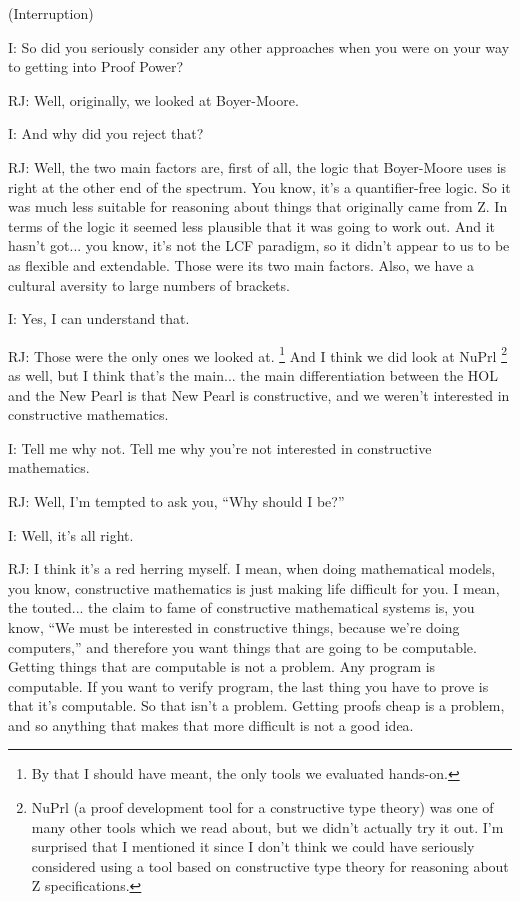 \documentclass[10pt,titlepage]{book}
\begin{document}
(Interruption)

I: So did you seriously consider any other approaches when you were on your way to getting into Proof Power?

RJ: Well, originally, we looked at Boyer-Moore.

I: And why did you reject that?

RJ: Well, the two main factors are, first of all, the logic that Boyer-Moore uses is right at the other end of the spectrum. You know, it's a quantifier-free logic.
So it was much less suitable for reasoning about things that originally came from Z.
In terms of the logic it seemed less plausible that it was going to work out.
And it hasn't got... you know, it's not the LCF paradigm, so it didn't appear to us to be as flexible and extendable.
Those were its two main factors.
Also, we have a cultural aversity to large numbers of brackets.

I: Yes, I can understand that.

RJ: Those were the only ones we looked at.%
\footnote{
By that I should have meant, the only tools we evaluated hands-on.
}%
And I think we did look at NuPrl%
\footnote{
NuPrl (a proof development tool for a constructive type theory) was one of many other tools which we read about, but we didn't actually try it out.
I'm surprised that I mentioned it since I don't think we could have seriously considered using a tool based on constructive type theory for reasoning about Z specifications.
}%
 as well, but I think that's the main... the main differentiation between the HOL and the New Pearl is that New Pearl is constructive, and we weren't interested in constructive mathematics.

I: Tell me why not.
Tell me why you're not interested in constructive mathematics.

RJ: Well, I'm tempted to ask you, ``Why should I be?''

I: Well, it's all right.

RJ: I think it's a red herring myself. I mean, when doing mathematical models, you know, constructive mathematics is just making life difficult for you. I mean, the touted... the claim to fame of constructive mathematical systems is, you know, ``We must be interested in constructive things, because we're doing computers,'' and therefore you want things that are going to be computable. Getting things that are computable is not a problem. Any program is computable. If you want to verify program, the last thing you have to prove is that it's computable. So that isn't a problem. Getting proofs cheap is a problem, and so anything that makes that more difficult is not a good idea.
\end{document}
